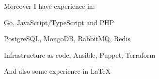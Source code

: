 Moreover I have experience in:
\begin{bulist}
  \item Go, JavaScript/TypeScript and PHP
  \item PostgreSQL, MongoDB, RabbitMQ, Redis
  \item Infrastructure as code, Ansible, Puppet, Terraform
\end{bulist}
And also some experience in \LaTeX

